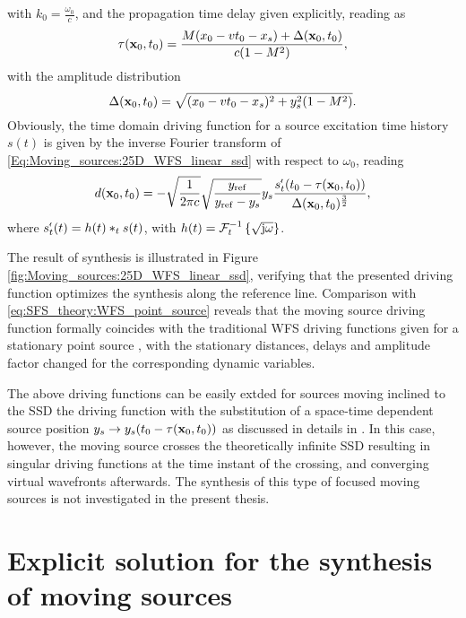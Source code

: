 with $k_0 = \frac{\omega_0}{c}$, and the propagation time delay given explicitly, reading as
\begin{equation}
\tau(\mathbf{x}_0,t_0) = \frac{M (x_0 - v t_0 - x_s )+\Delta(\mathbf{x}_0,t_0)}{c (1-M^2)}, 
\end{equation}
with the amplitude distribution
\begin{equation}
\Delta(\mathbf{x}_0,t_0) = \sqrt{(x_0 - v t_0 - x_s)^2 + y_s^2(1-M^2)}.
\end{equation}
Obviously, the time domain driving function for a source excitation time history $s(t)$ is given by the inverse Fourier transform of \eqref{Eq:Moving_sources:25D_WFS_linear_ssd} with respect to $\omega_0$, reading 
\begin{equation}
d(\mathbf{x}_0,t_0) = -
\sqrt{\frac{ 1 }{2\pi c} }
\sqrt{\frac{ y_{\mathrm{ref}} }{y_{\mathrm{ref}}-y_s}}
y_s
\frac{s^{\nshortmid}_t(t_0 - \tau( \mathbf{x}_0,t_0 ))}{\Delta(\mathbf{x}_0,t_0)^{\frac{3}{2}}},
\label{Eq:Moving_sources:25D_WFS_linear_ssd_td}
\end{equation}
where $s^{\nshortmid}_t(t) = h(t) \ast_{t} s(t)$, with $h(t) = \mathcal{F}^{-1}_t\left\{ \sqrt{\mathrm{j} \omega} \right\}$.

The result of synthesis is illustrated in Figure \ref{fig:Moving_sources:25D_WFS_linear_ssd}, verifying that the presented driving function optimizes the synthesis along the reference line.
Comparison with \eqref{eq:SFS_theory:WFS_point_source} reveals that the moving source driving function formally coincides with the traditional WFS driving functions given for a stationary point source \cite[(2.27)]{Verheijen1997:phd}, \cite[(3.16)\&(3.17)]{Start1997:phd} with the stationary distances, delays and amplitude factor changed for the corresponding dynamic variables.

The above driving functions can be easily extded for sources moving inclined to the SSD the driving function with the substitution of a space-time dependent source position $y_s \rightarrow y_s(t_0 - \tau(\mathbf{x}_0,t_0))$ as discussed in details in \cite{firtha2016wave}.
In this case, however, the moving source crosses the theoretically infinite SSD resulting in singular driving functions at the time instant of the crossing, and converging virtual wavefronts afterwards.
The synthesis of this type of focused moving sources is not investigated in the present thesis.

\section{Explicit solution for the synthesis of moving sources}

